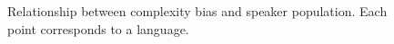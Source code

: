 \documentclass{evolang11}
\begin{document}
\begin{figure}[ht]
\begin{center}
\end{center}
\caption{Relationship between complexity bias and speaker population. Each point corresponds to a language. \label{fig2}}
\end{figure}







 
\end{document}
